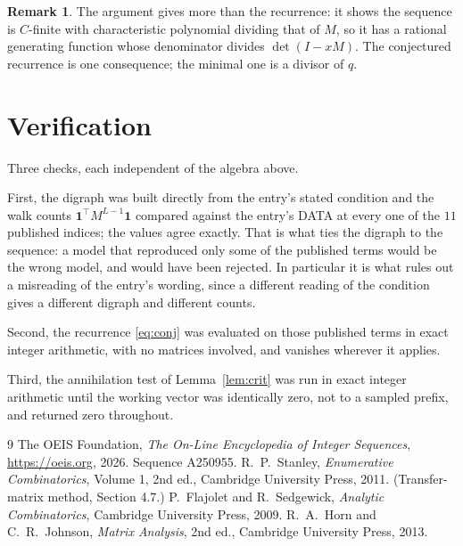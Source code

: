 \documentclass[11pt,a4paper]{article}
\theoremstyle{plain}
\theoremstyle{definition}
\newtheorem{remark}[theorem]{Remark}
\begin{document}
\begin{remark}
The argument gives more than the recurrence: it shows the sequence is $C$-finite with
characteristic polynomial dividing that of $M$, so it has a rational generating function
whose denominator divides $\det(I-xM)$. The conjectured recurrence is one consequence; the
minimal one is a divisor of $q$.
\end{remark}

\section{Verification}

Three checks, each independent of the algebra above.

First, the digraph was built directly from the entry's stated condition and the walk counts
$\mathbf{1}^{\!\top}M^{L-1}\mathbf{1}$ compared against the entry's DATA at
every one of the $11$ published indices; the values agree exactly. That is what ties
the digraph to the sequence: a model that reproduced only some of the published terms would
be the wrong model, and would have been rejected. In particular it is what rules out a
misreading of the entry's wording, since a different reading of the condition gives a
different digraph and different counts.

Second, the recurrence \eqref{eq:conj} was evaluated on those published terms in exact
integer arithmetic, with no matrices involved, and vanishes wherever it applies.

Third, the annihilation test of Lemma~\ref{lem:crit} was run in exact integer arithmetic
until the working vector was identically zero, not to a sampled prefix, and returned zero
throughout.

\begin{thebibliography}{9}
 The OEIS Foundation, \emph{The On-Line Encyclopedia of Integer
Sequences}, \url{https://oeis.org}, 2026. Sequence A250955.
 R.~P.~Stanley, \emph{Enumerative Combinatorics}, Volume 1, 2nd ed.,
Cambridge University Press, 2011. (Transfer-matrix method, Section 4.7.)
 P.~Flajolet and R.~Sedgewick, \emph{Analytic Combinatorics}, Cambridge
University Press, 2009.
 R.~A.~Horn and C.~R.~Johnson, \emph{Matrix Analysis}, 2nd ed., Cambridge
University Press, 2013.
\end{thebibliography}
\end{document}
